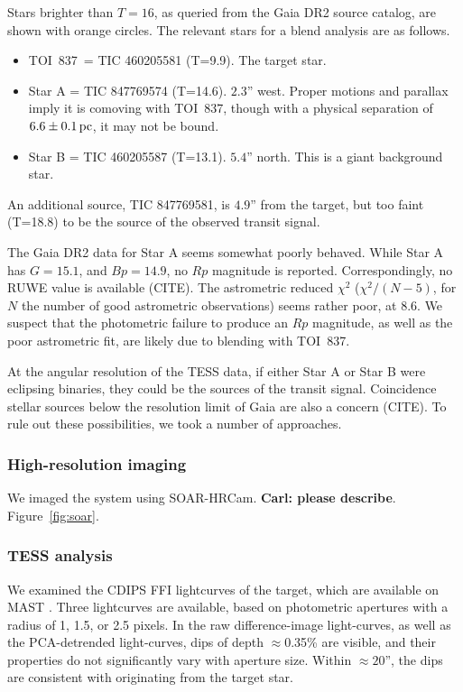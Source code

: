 \documentclass[12pt,twocolumn,tighten]{aastex62}
\newcommand{\tn}{TOI~837} %
\begin{document}
Stars brighter than $T=16$, as queried from the Gaia DR2 source
catalog, are shown with orange circles.
The relevant stars for a blend analysis are as follows.
\begin{itemize}
  \item \tn\ = TIC 460205581 (T=9.9). The target star.
  \item Star A = TIC 847769574 (T=14.6). $2.3$'' west. Proper motions
    and parallax imply it is comoving with \tn, though with a physical
    separation of $6.6\pm 0.1\,{\rm pc}$, it may not be bound.
  \item Star B = TIC 460205587 (T=13.1). $5.4$'' north.  This is a
    giant background star.
\end{itemize}
An additional source, TIC 847769581, is $4.9$'' from the target, but
too faint (T=18.8) to be the source of the observed transit signal.

The Gaia DR2 data for Star A seems somewhat poorly behaved.  While
Star A has $G=15.1$, and $Bp=14.9$, no $Rp$ magnitude is reported.
Correspondingly, no RUWE value is available (CITE).  The astrometric
reduced $\chi^2$ ($\chi^2 / (N-5)$, for $N$ the number of good
astrometric observations) seems rather poor, at $8.6$.  We suspect
that the photometric failure to produce an $Rp$ magnitude, as well as
the poor astrometric fit, are likely due to blending with \tn.

At the angular resolution of the TESS data, if either Star A or Star B
were eclipsing binaries, they could be the sources of the transit
signal.  Coincidence stellar sources below the resolution limit of
Gaia are also a concern (CITE). To rule out these possibilities, we
took a number of approaches.


\subsubsection{High-resolution imaging}

We imaged the system using SOAR-HRCam.
{\bf Carl: please describe}.
Figure~\ref{fig:soar}.
\citet{ziegler_soar_2020}


\subsubsection{TESS analysis}

We examined the CDIPS FFI lightcurves of the target, which are
available on MAST \citep{bouma_cluster_2019}. Three lightcurves are
available, based on photometric apertures with a radius of 1, 1.5, or
2.5 pixels.  In the raw difference-image light-curves, as well as the
PCA-detrended light-curves, dips of depth $\approx$0.35\% are visible,
and their properties do not significantly vary with aperture size.
Within $\approx20$'', the dips are consistent with originating from
the target star.
\end{document}

